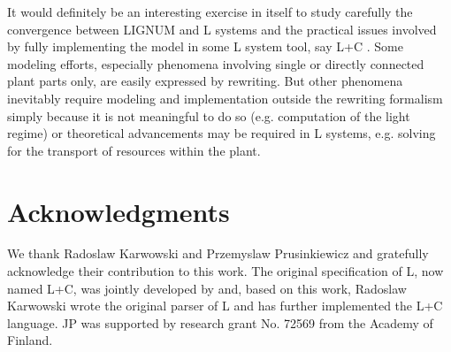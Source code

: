 It  would definitely  be an  interesting exercise  in itself  to study
carefully  the  convergence  between  LIGNUM  and L  systems  and  the
practical  issues involved  by fully  implementing the  model  in some
L system tool,  say L+C \citep{karwowski:02}.   Some modeling efforts,
especially  phenomena  involving single  or  directly connected  plant
parts only,  are easily expressed  by rewriting.  But  other phenomena
inevitably require  modeling and implementation  outside the rewriting
formalism  simply  because  it  is  not  meaningful  to  do  so  (e.g.
computation of  the light regime)  or theoretical advancements  may be
required in  L systems, e.g.   solving for the transport  of resources
within the plant.

\section{Acknowledgments}

We   thank  Radoslaw  Karwowski   and  Przemyslaw   Prusinkiewicz  and
gratefully acknowledge their contribution  to this work.  The original
specification  of   L,  now  named  L+C,  was   jointly  developed  by
\citet{pp:99a} and,  based on this work, Radoslaw  Karwowski wrote the
original parser of L and  has further implemented the L+C language. JP
was supported by research grant No. 72569 from the Academy of Finland.
 